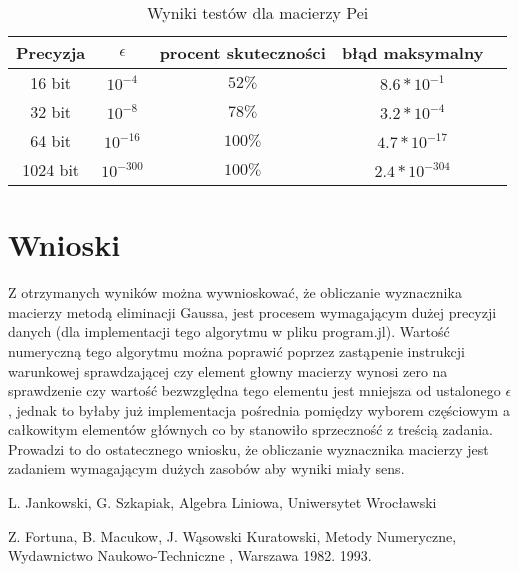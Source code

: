 \documentclass{article}
\begin{document}
\begin{table}[htbp]
\centering
\caption[Short Heading]{Wyniki testów dla macierzy Pei}
\begin{tabular}{|c|c|c|c|c|} \hline
Precyzja & $\epsilon$ & procent skuteczności & błąd maksymalny\\ \hline
16 bit & $10^{-4}$ & $52 \%$ & $8.6*10^{-1}$\\ \hline
32 bit & $10^{-8}$ & $78 \%$ & $3.2*10^{-4}$\\ \hline
64 bit & $10^{-16}$ & $100 \%$ & $4.7*10^{-17}$\\ \hline
1024 bit & $10^{-300}$ & $100 \%$ & $2.4*10^{-304}$\\ \hline
\end{tabular}
\end{table}

\newpage
\section{Wnioski}
Z otrzymanych wyników można wywnioskować, że obliczanie wyznacznika macierzy metodą eliminacji Gaussa, jest procesem wymagającym dużej precyzji danych (dla implementacji tego algorytmu w pliku program.jl).
Wartość numeryczną tego algorytmu można poprawić poprzez zastąpenie instrukcji warunkowej sprawdzającej czy element głowny macierzy wynosi zero na sprawdzenie czy wartość bezwzględna tego elementu jest mniejsza od ustalonego $\epsilon$, jednak to byłaby już implementacja pośrednia pomiędzy wyborem częściowym a całkowitym elementów głównych co by stanowiło sprzeczność z treścią zadania.  Prowadzi to do ostatecznego wniosku, że obliczanie wyznacznika macierzy jest zadaniem wymagającym dużych zasobów aby wyniki miały sens.



\begin{thebibliography}{9}
\itemsep2pt
 L. Jankowski, G. Szkapiak, Algebra Liniowa,  Uniwersytet Wrocławski

  Z. Fortuna, B. Macukow, J. Wąsowski Kuratowski, Metody Numeryczne, Wydawnictwo Naukowo-Techniczne , Warszawa 1982. 1993.

\end{thebibliography}
\end{document}
